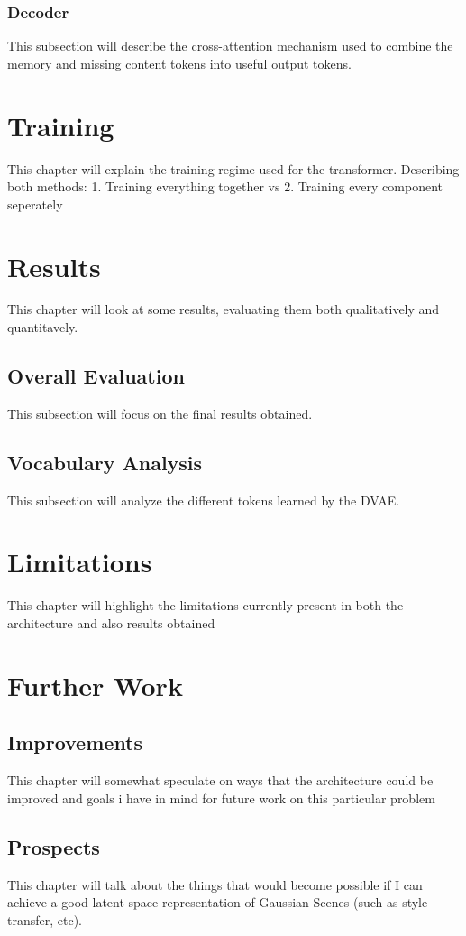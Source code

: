 \subsection{Decoder}
This subsection will describe the cross-attention mechanism used to combine the memory and missing content tokens into useful output tokens.
\chapter{Training}
This chapter will explain the training regime used for the transformer. Describing both methods: 1. Training everything together vs 2. Training every component seperately 
\chapter{Results}
This chapter will look at some results, evaluating them both qualitatively and quantitavely. 
\section{Overall Evaluation}
This subsection will focus on the final results obtained.
\section{Vocabulary Analysis}
This subsection will analyze the different tokens learned by the DVAE.

\chapter{Limitations}
This chapter will highlight the limitations currently present in both the architecture and also results obtained

\chapter{Further Work}
\section{Improvements}
This chapter will somewhat speculate on ways that the architecture could be improved and goals i have in mind for future work on this particular problem
\section{Prospects}
This chapter will talk about the things that would become possible if I can achieve a good latent space representation of Gaussian Scenes (such as style-transfer, etc).






